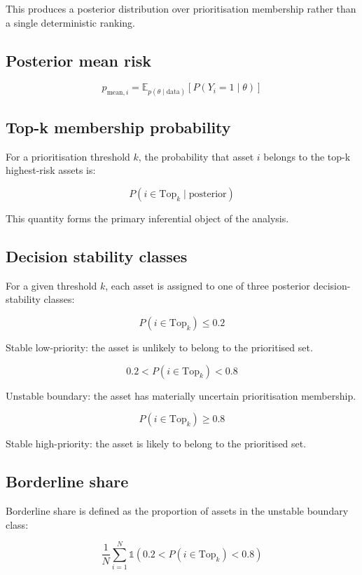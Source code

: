 \documentclass[
]{article}
\begin{document}
This produces a posterior distribution over prioritisation membership
rather than a single deterministic ranking.

\subsection{Posterior mean risk}\label{posterior-mean-risk}

\[
p_{\text{mean}, i}
=
\mathbb{E}_{p(\theta \mid \text{data})}
\left[
P(Y_i = 1 \mid \theta)
\right]
\]

\subsection{Top-k membership
probability}\label{top-k-membership-probability}

For a prioritisation threshold \(k\), the probability that asset \(i\)
belongs to the top-k highest-risk assets is:

\[
P(i \in \text{Top}_k \mid \text{posterior})
\]

This quantity forms the primary inferential object of the analysis.

\subsection{Decision stability
classes}\label{decision-stability-classes}

For a given threshold \(k\), each asset is assigned to one of three
posterior decision-stability classes:

\[
P(i \in \text{Top}_k) \leq 0.2
\]

Stable low-priority: the asset is unlikely to belong to the prioritised
set.

\[
0.2 < P(i \in \text{Top}_k) < 0.8
\]

Unstable boundary: the asset has materially uncertain prioritisation
membership.

\[
P(i \in \text{Top}_k) \geq 0.8
\]

Stable high-priority: the asset is likely to belong to the prioritised
set.

\subsection{Borderline share}\label{borderline-share}

Borderline share is defined as the proportion of assets in the unstable
boundary class:

\[
\frac{1}{N}\sum_{i=1}^{N}
\mathbb{1}\left(0.2 < P(i \in \text{Top}_k) < 0.8\right)
\]
\end{document}
